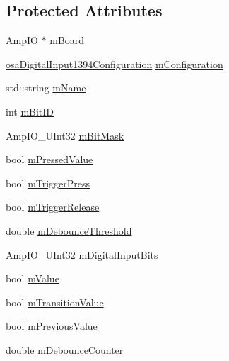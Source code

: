 \subsection*{Protected Attributes}
\begin{DoxyCompactItemize}
\item 
Amp\+I\+O $\ast$ \hyperlink{classsaw_robot_i_o1394_1_1osa_digital_input1394_a93581ba4f81ad98d30f425a25abb7dca}{m\+Board}
\item 
\hyperlink{structsaw_robot_i_o1394_1_1osa_digital_input1394_configuration}{osa\+Digital\+Input1394\+Configuration} \hyperlink{classsaw_robot_i_o1394_1_1osa_digital_input1394_a8b79a361c88f2612ccc41bbb8214b7bf}{m\+Configuration}
\item 
std\+::string \hyperlink{classsaw_robot_i_o1394_1_1osa_digital_input1394_a85c9f8c8b018618c95f3b0e2717d1142}{m\+Name}
\item 
int \hyperlink{classsaw_robot_i_o1394_1_1osa_digital_input1394_a4eddecb44399dcf72296c813bb578aff}{m\+Bit\+I\+D}
\item 
Amp\+I\+O\+\_\+\+U\+Int32 \hyperlink{classsaw_robot_i_o1394_1_1osa_digital_input1394_a18b04e419656a846e38a0461e4d90561}{m\+Bit\+Mask}
\item 
bool \hyperlink{classsaw_robot_i_o1394_1_1osa_digital_input1394_a0d90ac8bd939db2551e0452edd9a61ec}{m\+Pressed\+Value}
\item 
bool \hyperlink{classsaw_robot_i_o1394_1_1osa_digital_input1394_ac6ca087605b561e7e22b3992138f47ec}{m\+Trigger\+Press}
\item 
bool \hyperlink{classsaw_robot_i_o1394_1_1osa_digital_input1394_ae392f805d438b0d03b980146e9b53708}{m\+Trigger\+Release}
\item 
double \hyperlink{classsaw_robot_i_o1394_1_1osa_digital_input1394_a4d3524031a8e64c375d96f4487460c80}{m\+Debounce\+Threshold}
\item 
Amp\+I\+O\+\_\+\+U\+Int32 \hyperlink{classsaw_robot_i_o1394_1_1osa_digital_input1394_a7559d48897825942cbe87670b974bee9}{m\+Digital\+Input\+Bits}
\item 
bool \hyperlink{classsaw_robot_i_o1394_1_1osa_digital_input1394_af6b92673c21b3119f9ecbcb48d37e82a}{m\+Value}
\item 
bool \hyperlink{classsaw_robot_i_o1394_1_1osa_digital_input1394_a171fce3b8c874f4545bb4eeaf4a1f600}{m\+Transition\+Value}
\item 
bool \hyperlink{classsaw_robot_i_o1394_1_1osa_digital_input1394_ae5141e1c40246fa97dce7e90dad688ae}{m\+Previous\+Value}
\item 
double \hyperlink{classsaw_robot_i_o1394_1_1osa_digital_input1394_a6c941a62713dce958b6d5fce3aee7ac0}{m\+Debounce\+Counter}
\end{DoxyCompactItemize}


